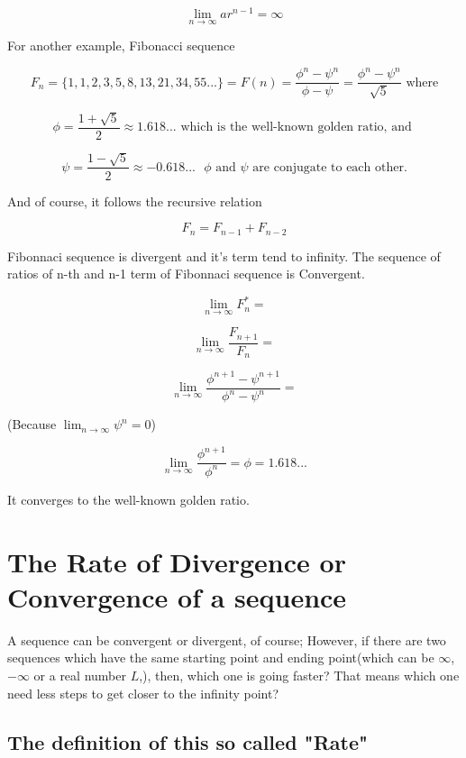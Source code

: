 \documentclass{article}
\begin{document}
  \[
	  \lim_{n \to \infty} ar^{n-1} = \infty
  \]

  For another example, Fibonacci sequence

  \[
	  F_n = \{1, 1, 2, 3, 5, 8, 13, 21, 34, 55...\} = F(n) = \dfrac{\phi^n - \psi^n}{\phi - \psi} = \dfrac{\phi^n - \psi^n}{\sqrt{5}} \text{ where}
  \]

  \[
	  \phi = \dfrac{1+\sqrt{5}}{2} \approx 1.618... \text{ which is the well-known golden ratio, and }
  \]

  \[
	  \psi = \dfrac{1-\sqrt{5}}{2} \approx -0.618... \text{ } \phi \text{ and } \psi \text{ are conjugate to each other.}
  \]

  And of course, it follows the recursive relation

  \[
	  F_n = F_{n-1} + F_{n-2}
  \]

  Fibonnaci sequence is divergent and it's term tend to infinity. The sequence of ratios of n-th and n-1 term of Fibonnaci sequence is Convergent.

  \[
	  \lim_{n \to \infty} F_n^* =
  \]

  \[
	  \lim_{n \to \infty} \dfrac{F_{n+1}}{F_n} = 
  \]

  \[
	  \lim_{n \to \infty} \dfrac{\phi^{n+1} - \psi^{n+1}}{\phi^n - \psi^n} = 
  \]

  \begin{center}
	  (Because $\displaystyle \lim_{n \to \infty} \psi^n = 0$)
  \end{center}

  \[
	  \lim_{n \to \infty} \dfrac{\phi^{n+1}}{\phi^n} = \phi = 1.618...
  \]

  It converges to the well-known golden ratio.

  \section{The Rate of Divergence or Convergence of a sequence}
  A sequence can be convergent or divergent, of course; However, if there are two sequences which have the same starting point and ending point(which can be $\infty$, $-\infty$ or a real number $L$,), then, which one is going faster? That means which one need less steps to get closer to the infinity point?

  \subsection{The definition of this so called "Rate"}
\end{document}
